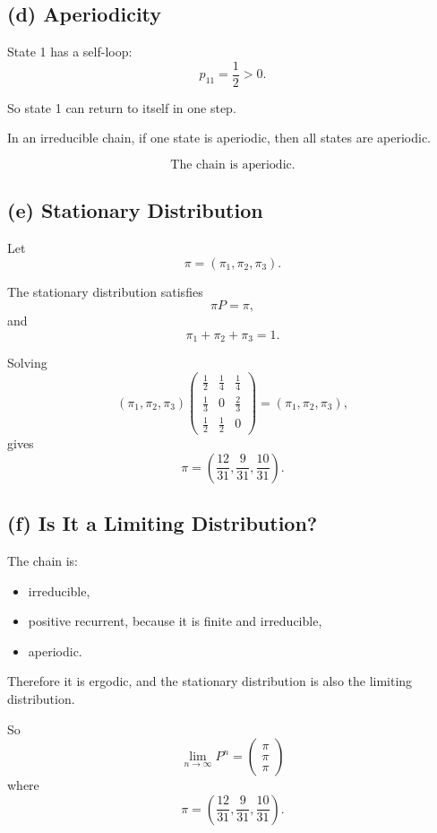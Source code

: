 \documentclass[12pt]{article}
\begin{document}
\subsection*{(d) Aperiodicity}

State 1 has a self-loop:
\[
p_{11}=\frac12>0.
\]

So state 1 can return to itself in one step.

In an irreducible chain, if one state is aperiodic, then all states are aperiodic.

\[
\boxed{\text{The chain is aperiodic.}}
\]

\subsection*{(e) Stationary Distribution}

Let
\[
\pi=(\pi_1,\pi_2,\pi_3).
\]

The stationary distribution satisfies
\[
\pi P=\pi,
\]
and
\[
\pi_1+\pi_2+\pi_3=1.
\]

Solving
\[
(\pi_1,\pi_2,\pi_3)
\begin{pmatrix}
\frac12 & \frac14 & \frac14\\
\frac13 & 0 & \frac23\\
\frac12 & \frac12 & 0
\end{pmatrix}
=
(\pi_1,\pi_2,\pi_3),
\]
gives
\[
\boxed{
\pi=
\left(\frac{12}{31},\frac{9}{31},\frac{10}{31}\right).
}
\]

\subsection*{(f) Is It a Limiting Distribution?}

The chain is:

\begin{itemize}
    \item irreducible,
    \item positive recurrent, because it is finite and irreducible,
    \item aperiodic.
\end{itemize}

Therefore it is ergodic, and the stationary distribution is also the limiting distribution.

So
\[
\boxed{
\lim_{n\to\infty}P^n
=
\begin{pmatrix}
\pi\\
\pi\\
\pi
\end{pmatrix}
}
\]
where
\[
\pi=
\left(\frac{12}{31},\frac{9}{31},\frac{10}{31}\right).
\]
\end{document}
